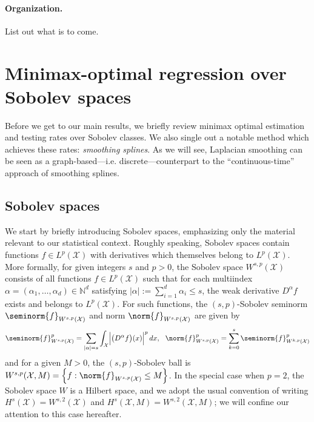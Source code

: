 \documentclass{article}
\newcommand{\abs}[1]{\left \lvert #1 \right \rvert}
\newcommand{\set}[1]{\left\{#1\right\}}
\newcommand{\1}{\mathbf{1}}
\newcommand{\Xset}{\mathcal{X}}
\newcommand{\Leb}{L}
\theoremstyle{alden}
\theoremstyle{aldenthm}
\theoremstyle{definition}
\theoremstyle{remark}
\begin{document}
\paragraph{Organization.}

List out what is to come.

\section{Minimax-optimal regression over Sobolev spaces}

Before we get to our main results, we briefly review minimax optimal estimation and testing rates over Sobolev classes. We also single out a notable method which achieves these rates: \emph{smoothing splines}. As we will see, Laplacian smoothing can be seen as a graph-based---i.e. discrete---counterpart to the ``continuous-time'' approach of smoothing splines. 

\subsection{Sobolev spaces}
\label{subsec:sobolev_spaces}

We start by briefly introducing Sobolev spaces, emphasizing only the material relevant to our statistical context. Roughly speaking, Sobolev spaces contain functions $f \in \Leb^p(\Xset)$ with derivatives which themselves belong to $\Leb^p(\Xset)$. More formally, for given integers $s$ and $p > 0$, the Sobolev space $W^{s,p}(\Xset)$ consists of all functions $f \in \Leb^p(\Xset)$ such that for each multiindex $\alpha = (\alpha_1,\ldots,\alpha_d) \in \mathbb{N}^d$ satisfying $\abs{\alpha} := \sum_{i = 1}^{d} \alpha_i \leq s$, the weak derivative $D^{\alpha}f$ exists and belongs to $\Leb^p(\Xset)$. For such functions, the $(s,p)$-Sobolev seminorm $\seminorm{f}_{W^{s,p}(\Xset)}$ and norm $\norm{f}_{W^{s,p}(\Xset)}$ are given by 
\begin{equation*}
\seminorm{f}_{W^{s,p}(\Xset)}^p = \sum_{\abs{\alpha} = s}\int_{\mathcal{X}} \Bigl|\bigl(D^{\alpha}f\bigr)(x)\Bigr|^p \,dx, ~~ \norm{f}_{W^{s,p}(\Xset)}^p = \sum_{k = 0}^{s} \seminorm{f}_{W^{k,p}(\Xset)}^p
\end{equation*}
and for a given $M > 0$, the $(s,p)$-Sobolev ball is $W^{s,p}(\Xset, M) = \set{f: \norm{f}_{W^{s,p}(\Xset)} \leq M}$. In the special case when $p = 2$, the Sobolev space $W$ is a Hilbert space, and we adopt the usual convention of writing $H^s(\Xset) = W^{s,2}(\Xset)$ and $H^s(\Xset,M) = W^{s,2}(\Xset,M)$; we will confine our attention to this case hereafter.
\end{document}
